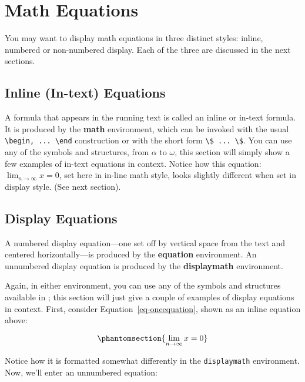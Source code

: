 \section{Math Equations}\label{math-equations}

You may want to display math equations in three distinct styles: inline,
numbered or non-numbered display. Each of the three are discussed in the
next sections.

\subsection{Inline (In-text) Equations}\label{inline-in-text-equations}

A formula that appears in the running text is called an inline or
in-text formula. It is produced by the \textbf{math} environment, which
can be invoked with the usual
\texttt{\textbackslash{}begin,\ ...\ \textbackslash{}end} construction
or with the short form
\texttt{\textbackslash{}\$\ ...\ \textbackslash{}\$}. You can use any of
the symbols and structures, from \(\alpha\) to \(\omega\), this section will simply show a few
examples of in-text equations in context. Notice how this equation:
\(\lim_{n\rightarrow \infty}x=0\), set here in in-line math style, looks
slightly different when set in display style. (See next section).

\subsection{Display Equations}\label{display-equations}

A numbered display equation---one set off by vertical space from the
text and centered horizontally---is produced by the \textbf{equation}
environment. An unnumbered display equation is produced by the
\textbf{displaymath} environment.

Again, in either environment, you can use any of the symbols and
structures available in \LaTeX@; this section will just give a couple of
examples of display equations in context. First, consider
Equation~\ref{eq-oneequation}, shown as an inline equation above:

\begin{equation}\phantomsection{
\lim_{n\rightarrow \infty}x=0
}\label{eq-oneequation}\end{equation}

Notice how it is formatted somewhat differently in the
\texttt{displaymath} environment. Now, we'll enter an unnumbered
equation:

